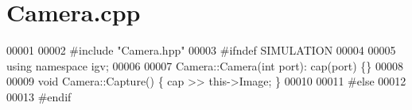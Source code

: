 \hypertarget{Camera_8cpp_source}{}\section{Camera.\+cpp}
\label{Camera_8cpp_source}

\begin{DoxyCode}
00001 
00002 \textcolor{preprocessor}{#}\textcolor{preprocessor}{include} \textcolor{preprocessor}{"Camera.hpp"}
00003 \textcolor{preprocessor}{#}\textcolor{preprocessor}{ifndef} \textcolor{preprocessor}{SIMULATION}
00004 
00005 \textcolor{keyword}{using} \textcolor{keyword}{namespace} igv;
00006 
00007 Camera::Camera(\textcolor{keywordtype}{int} port): cap(port) \{\}
00008 
00009 \textcolor{keywordtype}{void} Camera::Capture() \{ cap >> \textcolor{keyword}{this}->Image; \}
00010 
00011 \textcolor{preprocessor}{#}\textcolor{preprocessor}{else}
00012 
00013 \textcolor{preprocessor}{#}\textcolor{preprocessor}{endif}
\end{DoxyCode}
